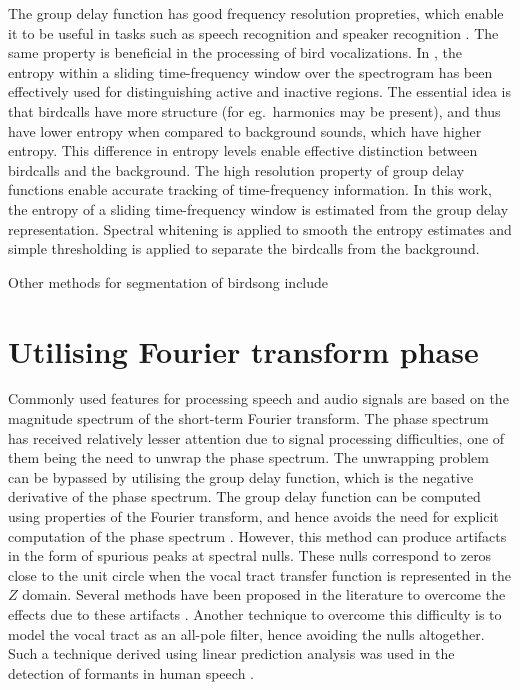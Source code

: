 \documentclass[a4paper]{article}
\begin{document}
The group delay function has good frequency resolution propreties, which enable
it to be useful in tasks such as speech recognition and speaker recognition
\cite{hema,padman}. The same property is beneficial in the processing of bird
vocalizations. In \cite{wang2013}, the entropy within a sliding time-frequency
window over the spectrogram has been effectively used for distinguishing active
and inactive regions. The essential idea is that birdcalls have more structure
(for eg.~harmonics may be present), and thus have lower entropy when compared to
 background sounds, which have higher entropy. This difference in entropy
levels enable effective distinction between birdcalls and the background.
The high resolution property of group delay functions enable accurate tracking
of time-frequency information. In this work, the entropy of a sliding
time-frequency window is estimated from the group delay representation. Spectral
whitening is applied to smooth the entropy estimates and simple thresholding is
applied to separate the birdcalls from the background.

Other methods for segmentation of birdsong include

\section{Utilising Fourier transform phase}

Commonly used features for processing speech and audio signals are based on the
magnitude spectrum of the short-term Fourier transform. The phase spectrum has
received relatively lesser attention due to signal processing difficulties, one
of them being the need to unwrap the phase spectrum. The unwrapping problem can be
bypassed by utilising the group delay function, which is the negative derivative
of the phase spectrum. The group delay function can be
computed using properties of the Fourier transform, and hence avoids the need
for explicit computation of the phase spectrum \cite{gdDeriv}. 
However, this method can produce
artifacts in the form of spurious peaks at spectral nulls. These nulls
correspond to zeros close to the unit circle when the vocal tract transfer
function is represented in the $Z$ domain. 
Several methods have been proposed in the literature to overcome the effects due
to these artifacts \cite{modgdf, productSpectrum}. Another technique to overcome
this difficulty is to model the vocal tract as an all-pole filter, hence
avoiding the nulls altogether. Such a
technique derived using linear prediction analysis was used in the detection of
formants in human speech \cite{yegnaFormant}. 
\end{document}
